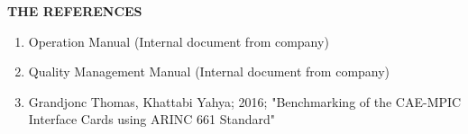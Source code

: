 \documentclass[a4paper,13pt]{report}
\begin{document}
    
    
    

    

    

    

    \newpage
    \thispagestyle{plain}
    \begin{center}
        \Huge{\textbf{THE REFERENCES}}
    \end{center}
    \vspace{3mm}
    \begin{enumerate}
        \item Operation Manual (Internal document from company)
        \item Quality Management Manual (Internal document from company)
        \item Grandjonc Thomas, Khattabi Yahya; 2016; "Benchmarking of the CAE-MPIC Interface Cards
        using ARINC 661 Standard" 
    \end{enumerate}
\end{document}
